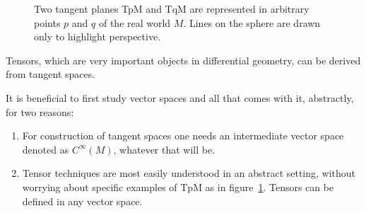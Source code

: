 \begin{figure}[ht]
  \caption{Two tangent planes TpM and TqM are represented in arbitrary points $p$ and $q$ of the
    real world $M$. Lines on the sphere are drawn only to highlight perspective.}
  \label{fig:mla-two-tangent-planes}
\end{figure}

Tensors, which are very important objects in differential geometry, can be derived from tangent
spaces.

It is beneficial to first study vector spaces and all that comes with it, abstractly, for two
reasons:
\begin{enumerate}
\item For construction of tangent spaces one needs an intermediate vector space denoted as
  $C^\infty (M)$, whatever that will be.
\item Tensor techniques are most easily understood in an abstract setting, without worrying about
  specific examples of $\text{TpM}$ as in figure~\ref{fig:mla-two-tangent-planes}. Tensors can be
  defined in any vector space.
\end{enumerate}


